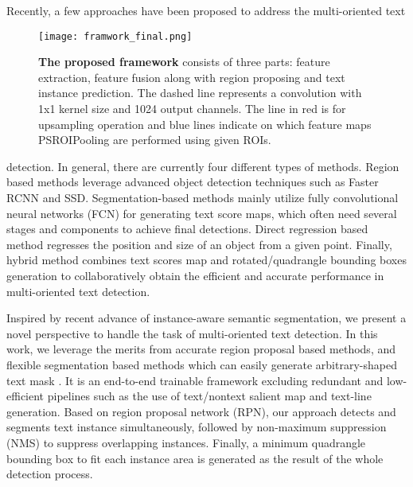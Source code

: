 \documentclass[a4paper,conference]{IEEEtran}
\begin{document}
Recently, a few approaches\cite{Qin2017Cascaded,He2017deep_direct,Shi2017Detecting,Zhou2017EAST,Liu2017deep,Ma2017arbitrary} have been proposed to address the multi-oriented text
\begin{figure*}[h]
\begin{center}
  
\texttt{[image: framwork\_final.png]}
\caption{
\textbf{The proposed framework} consists of three parts: feature extraction, feature fusion along with region proposing and text instance prediction. The dashed line represents a convolution with 1x1 kernel size and 1024 output channels. The line in red is for upsampling operation and blue lines indicate on which feature maps PSROIPooling are performed using given ROIs.} 

\end{center}
\end{figure*}
detection. In general, there are currently four different types of methods. Region based methods\cite{Shi2017Detecting,Ma2017arbitrary,Liu2017deep} leverage advanced object detection techniques such as Faster RCNN\cite{Ren2017Faster} and SSD\cite{liu2016ssd}. Segmentation-based methods\cite{zhang2016multi_oriented,he2016accurate} mainly utilize fully convolutional neural networks (FCN) for generating text score maps, which often need several stages and components to achieve final detections. Direct regression based method\cite{He2017deep_direct} regresses the position and size of an object from a given point. Finally, hybrid method\cite{Zhou2017EAST} combines text scores map and rotated/quadrangle bounding boxes generation to collaboratively obtain the efficient and accurate performance in multi-oriented text detection. 

Inspired by recent advance of instance-aware semantic  segmentation\cite{li2016fully,he2017mask}, we present a novel perspective to handle the task of multi-oriented text detection. In this work, we leverage the merits from accurate region proposal based methods\cite{Ren2017Faster}, and flexible segmentation based methods which can easily generate arbitrary-shaped text mask\cite{zhang2016multi_oriented,he2016accurate} . It is an end-to-end trainable framework excluding redundant and low-efficient pipelines such as the use of text/nontext
salient map\cite{zhang2016multi_oriented} and text-line generation\cite{he2016accurate}. Based on region proposal network (RPN), our approach detects and segments text instance simultaneously, followed by non-maximum suppression (NMS) to suppress overlapping instances.
Finally, a minimum quadrangle bounding box to fit each instance area is generated as the result of the whole detection process.
\end{document}
